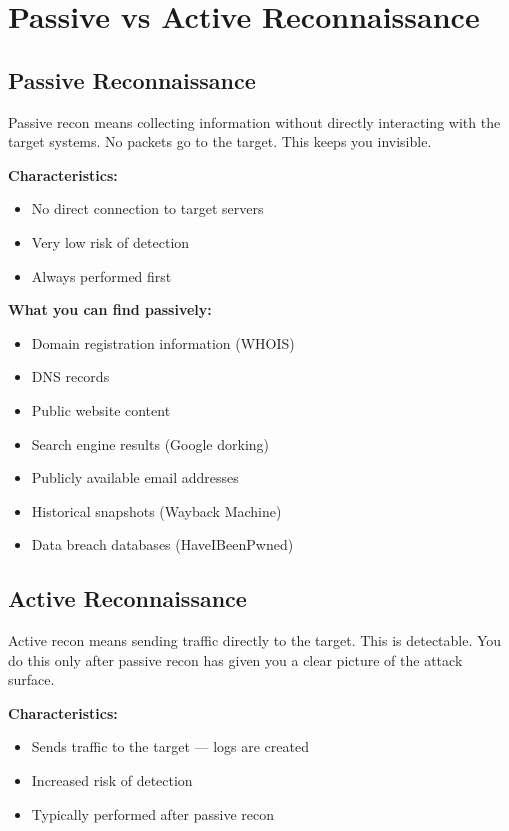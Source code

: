 \section{Passive vs Active Reconnaissance}
\label{sec:passive_active_recon}

\subsection{Passive Reconnaissance}

Passive recon means collecting information without directly interacting with the
target systems. No packets go to the target. This keeps you invisible.

\textbf{Characteristics:}
\begin{itemize}
  \item No direct connection to target servers
  \item Very low risk of detection
  \item Always performed first
\end{itemize}

\textbf{What you can find passively:}
\begin{itemize}
  \item Domain registration information (WHOIS)
  \item DNS records
  \item Public website content
  \item Search engine results (Google dorking)
  \item Publicly available email addresses
  \item Historical snapshots (Wayback Machine)
  \item Data breach databases (HaveIBeenPwned)
\end{itemize}

\subsection{Active Reconnaissance}

Active recon means sending traffic directly to the target. This is detectable. You
do this only after passive recon has given you a clear picture of the attack surface.

\textbf{Characteristics:}
\begin{itemize}
  \item Sends traffic to the target --- logs are created
  \item Increased risk of detection
  \item Typically performed after passive recon
\end{itemize}

